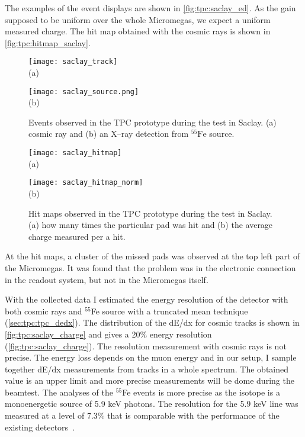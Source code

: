\documentclass[../main.tex]{subfiles}
\begin{document}
The examples of the event displays are shown in \autoref{fig:tpc:saclay_ed}. As the gain supposed to be uniform over the whole Micromegas, we expect a uniform measured charge. The hit map obtained with the cosmic rays is shown in \autoref{fig:tpc:hitmap_saclay}.

\begin{figure}[!ht]
  \centering
  \begin{minipage}{0.49\linewidth}
  \centering
    \texttt{[image: saclay\_track]} \\ (a)
  \end{minipage}
  \begin{minipage}{0.49\linewidth}
  \centering
    \texttt{[image: saclay\_source.png]} \\ (b)
  \end{minipage}
  \caption{Events observed in the TPC prototype during the test in Saclay. (a) cosmic ray and (b) an X--ray detection from ${}^{55}\text{Fe}$ source.}
  \label{fig:tpc:saclay_ed}
\end{figure}

\begin{figure}[!ht]
  \centering
  \begin{minipage}{0.49\linewidth}
  \centering
    \texttt{[image: saclay\_hitmap]} \\ (a)
  \end{minipage}
  \begin{minipage}{0.49\linewidth}
  \centering
    \texttt{[image: saclay\_hitmap\_norm]} \\ (b)
  \end{minipage}
  \caption{Hit maps observed in the TPC prototype during the test in Saclay. (a) how many times the particular pad was hit and (b) the average charge measured per a hit.}
  \label{fig:tpc:hitmap_saclay}
\end{figure}

At the hit maps, a cluster of the missed pads was observed at the top left part of the Micromegas. It was found that the problem was in the electronic connection in the readout system, but not in the Micromegas itself.

With the collected data I estimated the energy resolution of the detector with both cosmic rays and ${}^{55}$Fe source with a truncated mean technique (\autoref{sec:tpc:tpc_dedx}). The distribution of the dE/dx for cosmic tracks is shown in \autoref{fig:tpc:saclay_charge} and gives a 20\% energy resolution (\autoref{fig:tpc:saclay_charge}). The resolution measurement with cosmic rays is not precise. The energy loss depends on the muon energy and in our setup, I sample together dE/dx measurements from tracks in a whole spectrum. The obtained value is an upper limit and more precise measurements will be dome during the beamtest. The analyses of the ${}^{55}$Fe events is more precise as the isotope is a monoenergetic source of 5.9 keV photons. The resolution for the 5.9 keV line was measured at a level of 7.3\% that is comparable with the performance of the existing detectors~\cite{Abgrall2011}.
\end{document}
